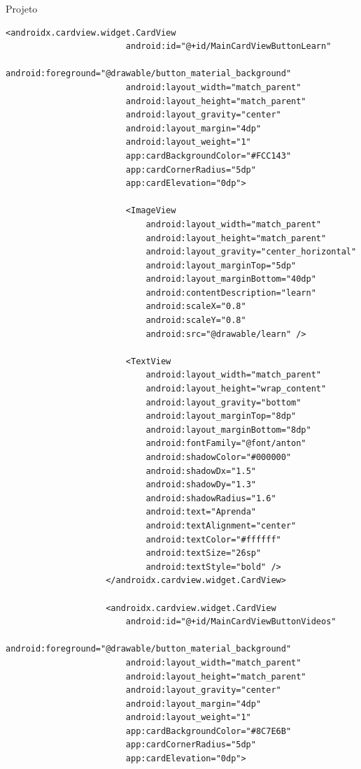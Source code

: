 \documentclass[
	12pt,				%
	openright,			%
	twoside,			%
	a4paper,			%
	english,			%
	french,				%
	spanish,			%
	brazil				%
	]{abntex2}
\begin{document}
\begin{chapter}{Projeto}
\begin{lstlisting}[numbers=none,
basicstyle=\small,
caption={Fragment Main.xml},
title={Fragment Main.xml},
xleftmargin=4pt,
label={fragment_main.xml}]
                    <androidx.cardview.widget.CardView
                        android:id="@+id/MainCardViewButtonLearn"
                        android:foreground="@drawable/button_material_background"
                        android:layout_width="match_parent"
                        android:layout_height="match_parent"
                        android:layout_gravity="center"
                        android:layout_margin="4dp"
                        android:layout_weight="1"
                        app:cardBackgroundColor="#FCC143"
                        app:cardCornerRadius="5dp"
                        app:cardElevation="0dp">

                        <ImageView
                            android:layout_width="match_parent"
                            android:layout_height="match_parent"
                            android:layout_gravity="center_horizontal"
                            android:layout_marginTop="5dp"
                            android:layout_marginBottom="40dp"
                            android:contentDescription="learn"
                            android:scaleX="0.8"
                            android:scaleY="0.8"
                            android:src="@drawable/learn" />

                        <TextView
                            android:layout_width="match_parent"
                            android:layout_height="wrap_content"
                            android:layout_gravity="bottom"
                            android:layout_marginTop="8dp"
                            android:layout_marginBottom="8dp"
                            android:fontFamily="@font/anton"
                            android:shadowColor="#000000"
                            android:shadowDx="1.5"
                            android:shadowDy="1.3"
                            android:shadowRadius="1.6"
                            android:text="Aprenda"
                            android:textAlignment="center"
                            android:textColor="#ffffff"
                            android:textSize="26sp"
                            android:textStyle="bold" />
                    </androidx.cardview.widget.CardView>

                    <androidx.cardview.widget.CardView
                        android:id="@+id/MainCardViewButtonVideos"
                        android:foreground="@drawable/button_material_background"
                        android:layout_width="match_parent"
                        android:layout_height="match_parent"
                        android:layout_gravity="center"
                        android:layout_margin="4dp"
                        android:layout_weight="1"
                        app:cardBackgroundColor="#8C7E6B"
                        app:cardCornerRadius="5dp"
                        app:cardElevation="0dp">


\end{lstlisting}
\end{chapter}
\end{document}
